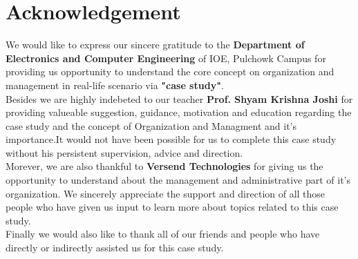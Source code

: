 \section*{Acknowledgement}
We would like to express our sincere gratitude to the \textbf{Department of Electronics and Computer Engineering} of IOE, Pulchowk Campus for providing us opportunity to understand the core concept on organization and management in real-life scenario via \textbf{"case study"}.\\
Besides we are highly indebeted to our teacher \textbf{Prof. Shyam Krishna Joshi} for providing valueable suggestion, guidance, motivation and education regarding the case study and the concept of Organization and Managment and it's importance.It would not have been possible for us to complete this case study without his persistent supervision, advice and direction.\\
Morever, we are also thankful to \textbf{Versend Technologies} for giving us the opportunity to understand about the management and administrative part of it's organization. We sincerely appreciate the support and direction of all those people who have given us input to learn more about topics related to this case study.\\
Finally we would also like to thank all of our friends and people who have directly or indirectly assisted us for this case study.\\
\cleardoublepage

